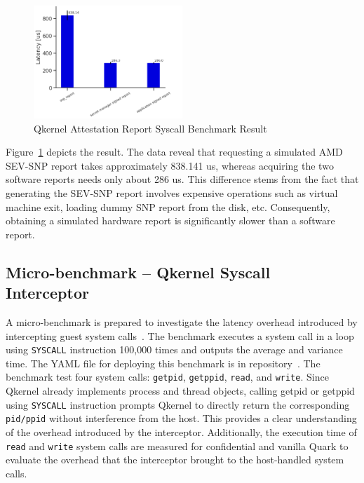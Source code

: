 \begin{figure}[!htb]
    \centering
    \includegraphics[width=0.5\textwidth]{images/perf_attestation_report_result.PNG}
    \caption[Benchmark result of Attestation Report Syscall]{Qkernel Attestation Report Syscall Benchmark Result}
    \label{fig:perf_attestation_report_result}
\end{figure}

Figure~\ref{fig:perf_attestation_report_result} depicts the result. The data reveal that requesting a simulated AMD SEV-SNP report takes approximately 838.141 us, whereas acquiring the two software reports needs only about 286 us. This difference stems from the fact that generating the SEV-SNP report involves expensive operations 
such as virtual machine exit, loading dummy SNP report from the disk, etc. Consequently, obtaining a simulated hardware report is significantly slower than a software report.


\subsection{Micro-benchmark – Qkernel Syscall Interceptor}\label{bench_Interceptor}

A micro-benchmark is prepared to investigate the latency overhead introduced by intercepting guest system calls~\cite*{benchamark_systemcall_intercetion}. The benchmark executes a system call in a loop using \texttt{SYSCALL} instruction 100,000 times and outputs the average and variance time. The YAML file for deploying this benchmark is 
in repository~\cite*{perf_test_repo}. The benchmark test four system calls: \texttt{getpid}, \texttt{getppid}, \texttt{read}, and \texttt{write}. Since Qkernel already implements process and thread objects, calling getpid or getppid using \texttt{SYSCALL} instruction prompts Qkernel to directly return the corresponding \texttt{pid/ppid} without interference from the 
host. This provides a clear understanding of the overhead introduced by the interceptor. Additionally, the execution time of \texttt{read} and \texttt{write} system calls are measured for confidential and vanilla Quark to evaluate the overhead that the interceptor brought to the host-handled system calls.


